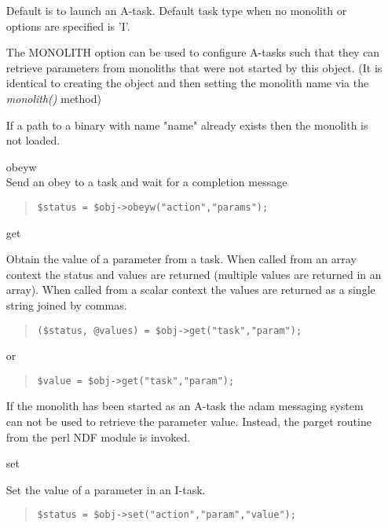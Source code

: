 \documentclass[twoside,11pt]{article}
\newenvironment{myquote}{\begin{quote}\begin{small}}{\end{small}\end{quote}}
\renewcommand{\_}{\texttt{\symbol{95}}}
\begin{document}
\begin{itemize}
Default is to launch an A-task. Default task type when no monolith
or options are specified is 'I'.

The MONOLITH option can be used to configure A-tasks such that 
they can retrieve parameters from monoliths that were not started by this 
object. (It is identical to creating the object and then setting the
monolith name via the {\em monolith()\/} method)

If a path to a binary with name "name" already exists then the monolith
is not loaded.

\item[obeyw]%
%
\hfill\\
Send an obey to a task and wait for a completion message
\begin{myquote}
\begin{verbatim}
$status = $obj->obeyw("action","params");
\end{verbatim}
\end{myquote}

\item[get]%
%

Obtain the value of a parameter from a task. 
When called from an array context the status and values are returned
(multiple values are returned in an array). When called from a scalar
context the values are returned as a single string joined by commas.

\begin{myquote}
\begin{verbatim}
($status, @values) = $obj->get("task","param");
\end{verbatim}
\end{myquote}
or
\begin{myquote}
\begin{verbatim}
$value = $obj->get("task","param");
\end{verbatim}
\end{myquote}

If the monolith has been started as an A-task the adam messaging
system can not be used to retrieve the parameter value. Instead,
the par\_{}get routine from the perl NDF module is invoked.

\item[set]%
%

Set the value of a parameter in an I-task.
\begin{myquote}
\begin{verbatim}
$status = $obj->set("action","param","value");
\end{verbatim}
\end{myquote}


\end{itemize}
\end{document}
